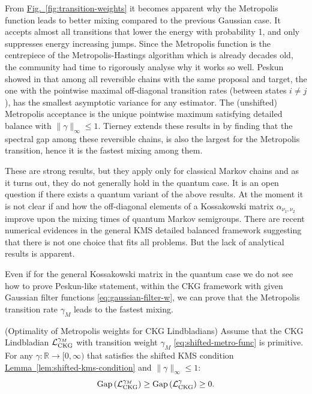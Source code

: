 From \hyperref[fig:transition-weights]{Fig.~\ref*{fig:transition-weights}} it becomes apparent why the Metropolis function leads to better mixing compared to the previous Gaussian case. It accepts almost all transitions that lower the energy with probability 1, and only suppresses energy increasing jumps. Since the Metropolis function is the centrepiece of the Metropolis-Hastings algorithm \cite{metropolis1953equation, hastings1970monte} which is already decades old, the community had time to rigorously analyse why it works so well. 
Peskun showed in \cite{peskun1973optimum} that among all reversible chains with the same proposal and target, the one with the pointwise maximal off-diagonal transition rates (between states $i \neq j$), has the smallest asymptotic variance for any estimator. The (unshifted) Metropolis acceptance is the unique pointwise maximum satisfying detailed balance with $\|\gamma\|_\infty\leq 1$. Tierney extends these results in \cite{tierney1998note} by finding that the spectral gap among these reversible chains, is also the largest for the Metropolis transition, hence it is the fastest mixing among them.

These are strong results, but they apply only for classical Markov chains and as it turns out, they do not generally hold in the quantum case. It is an open question if there exists a quantum variant of the above results. At the moment it is not clear if and how the off-diagonal elements of a Kossakowski matrix $\alpha_{\nu_1, \nu_2}$ improve upon the mixing times of quantum Markov semigroups. There are recent numerical evidences in the general KMS detailed balanced framework \cite{chen2024boosting,hahn2025efficient} suggesting that there is not one choice that fits all problems. But the lack of analytical results is apparent.

Even if for the general Kossakowski matrix in the quantum case we do not see how to prove Peskun-like statement, within the CKG framework with given Gaussian filter functions \eqref{eq:gaussian-filter-w}, we can prove that the Metropolis transition rate $\gamma_M$ leads to the fastest mixing.

\begin{proposition} \label{prop:optim-metro}
    \textup{(Optimality of Metropolis weights for CKG Lindbladians)} Assume that the CKG Lindbladian $\mathcal{L}_\textup{CKG}^{\gamma_M}$ with transition weight $\gamma_M$ \eqref{eq:shifted-metro-func} is primitive. For any $\gamma: \mathbb{R} \rightarrow [0, \infty)$ that satisfies the shifted KMS condition \hyperref[lem:shifted-kms-condition]{Lemma~\ref*{lem:shifted-kms-condition}} and $\|\gamma\|_\infty \leq 1$: 
    $$\textup{Gap}\left(\mathcal{L}_\textup{CKG}^{\gamma_M}\right) \geq \textup{Gap}\left(\mathcal{L}_\textup{CKG}^{\gamma}\right) \geq 0.$$
\end{proposition}

